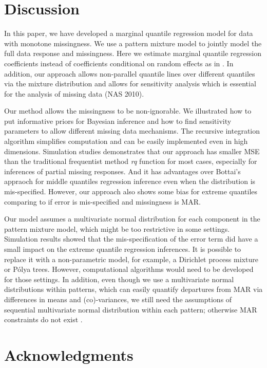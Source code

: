 \documentclass[useAMS,usenatbib,referee]{enar}
\newcommand{\polya}{P\'{o}lya} \newcommand{\yobs}{\bmath y_{\itl{obs}}}
\begin{document}
\section{Discussion}
\label{sec:discussion}

In this paper, we have developed a marginal quantile regression model
for data with monotone missingness. We use a pattern mixture model to
jointly model the full data response and missingness. Here we estimate
marginal quantile regression coefficients instead of coefficients
conditional on random effects as in \citet{yuan2010}. In addition, our
approach allows non-parallel quantile lines over different quantiles
via the mixture distribution and allows for sensitivity analysis which
is essential for the analysis of missing data (NAS 2010).

Our method allows the missingness to be non-ignorable.  We illustrated
how to put informative priors for Bayesian inference and how to find
sensitivity parameters to allow different missing data mechanisms. The
recursive integration algorithm simplifies computation and can be
easily implemented even in high dimensions. Simulation studies
demonstrates that our approach has smaller MSE than the traditional
frequentist method \textit{rq} function for most cases, especially for
inferences of partial missing responses. And it has advantages over
Bottai's appraoch for middle quantiles regression inference even when
the distribution is mis-specified.  However, our approach also shows
some bias for extreme quantiles comparing to \citet{bottai2013} if
error is mis-specified and missingness is MAR.

Our model assumes a multivariate normal distribution for each
component in the pattern mixture model, which might be too restrictive
in some settings. Simulation results showed that the mis-specification
of the error term did have a small impact on the extreme quantile
regression inferences.  It is possible to replace it with a
non-parametric model, for example, a Dirichlet process mixture or
\polya{} trees. However, computational algorithms would need to be
developed for those settings.  In addition, even though we use a
multivariate normal distributions within patterns, which can easily
quantify departures from MAR via differences in means and
(co)-variances, we still need the assumptions of sequential
multivariate normal distribution within each pattern; otherwise MAR
constraints do not exist \citep{wang2011}.


\backmatter

\section*{Acknowledgments}
\end{document}
